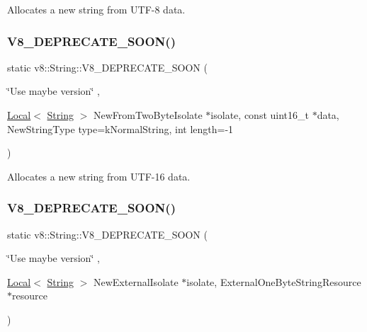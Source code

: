 Allocates a new string from U\+T\+F-\/8 data. \mbox{\label{classv8_1_1String_aeab948105979e2ffd61eb552b0da4e50}} 
\subsubsection{\texorpdfstring{V8\+\_\+\+D\+E\+P\+R\+E\+C\+A\+T\+E\+\_\+\+S\+O\+O\+N()}{V8\_DEPRECATE\_SOON()}\hspace{0.1cm}{\footnotesize\ttfamily [2/3]}}
{\footnotesize\ttfamily static v8\+::\+String\+::\+V8\+\_\+\+D\+E\+P\+R\+E\+C\+A\+T\+E\+\_\+\+S\+O\+ON (\begin{DoxyParamCaption}\item[{\char`\"{}Use maybe version\char`\"{}}]{,  }\item[{\mbox{\hyperlink{classv8_1_1Local}{Local}}$<$ \mbox{\hyperlink{classv8_1_1String}{String}} $>$ }]{New\+From\+Two\+ByteIsolate $\ast$isolate, const uint16\+\_\+t $\ast$data, New\+String\+Type type=k\+Normal\+String, int length=-\/1 }\end{DoxyParamCaption})\hspace{0.3cm}{\ttfamily [static]}}

Allocates a new string from U\+T\+F-\/16 data. \mbox{\label{classv8_1_1String_ad7186b5cfdddffbee8235a7216f31a67}} 
\subsubsection{\texorpdfstring{V8\+\_\+\+D\+E\+P\+R\+E\+C\+A\+T\+E\+\_\+\+S\+O\+O\+N()}{V8\_DEPRECATE\_SOON()}\hspace{0.1cm}{\footnotesize\ttfamily [3/3]}}
{\footnotesize\ttfamily static v8\+::\+String\+::\+V8\+\_\+\+D\+E\+P\+R\+E\+C\+A\+T\+E\+\_\+\+S\+O\+ON (\begin{DoxyParamCaption}\item[{\char`\"{}Use maybe version\char`\"{}}]{,  }\item[{\mbox{\hyperlink{classv8_1_1Local}{Local}}$<$ \mbox{\hyperlink{classv8_1_1String}{String}} $>$ }]{New\+ExternalIsolate $\ast$isolate, External\+One\+Byte\+String\+Resource $\ast$resource }\end{DoxyParamCaption})\hspace{0.3cm}{\ttfamily [static]}}

